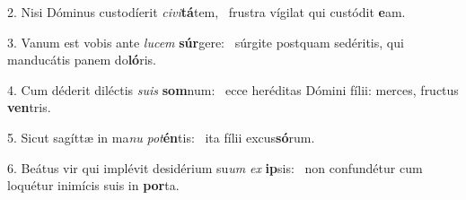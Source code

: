 2. Nisi Dóminus custodíerit \textit{ci}\textit{vi}\textbf{tá}tem, \ast\  frustra vígilat qui custódit \textbf{e}am.\

3. Vanum est vobis ante \textit{lu}\textit{cem} \textbf{súr}gere: \ast\  súrgite postquam sedéritis, qui manducátis panem do\textbf{ló}ris.\

4. Cum déderit diléctis \textit{su}\textit{is} \textbf{som}num: \ast\  ecce heréditas Dómini fílii: merces, fructus \textbf{ven}tris.\

5. Sicut sagíttæ in ma\textit{nu} \textit{pot}\textbf{én}tis: \ast\  ita fílii excus\textbf{só}rum.\

6. Beátus vir qui implévit desidérium su\textit{um} \textit{ex} \textbf{ip}sis: \ast\  non confundétur cum loquétur inimícis suis in \textbf{por}ta.\

